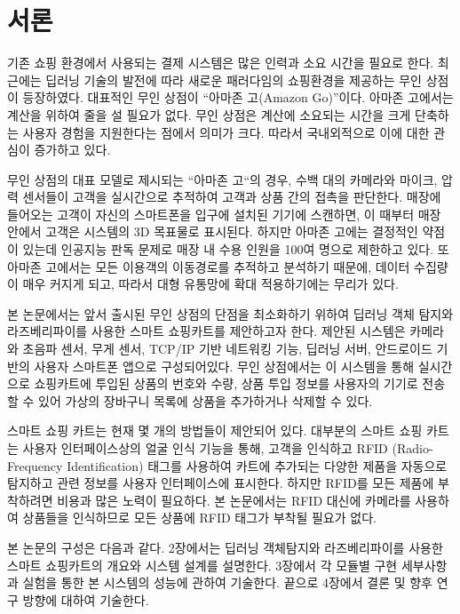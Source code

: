\documentclass[smallextended]{svjour3}       %
\begin{document}
\def\spacingset#1{\renewcommand{\baselinestretch}%
{#1}\small\normalsize} \spacingset{1}


\hypertarget{uxc11cuxb860}{%
\section{서론}\label{uxc11cuxb860}}

기존 쇼핑 환경에서 사용되는 결제 시스템은 많은 인력과 소요 시간을 필요로
한다. 최근에는 딥러닝 기술의 발전에 따라 새로운 패러다임의 쇼핑환경을
제공하는 무인 상점이 등장하였다. 대표적인 무인 상점이 ``아마존 고(Amazon
Go)''이다. 아마존 고에서는 계산을 위하여 줄을 설 필요가 없다. 무인
상점은 계산에 소요되는 시간을 크게 단축하는 사용자 경험을 지원한다는
점에서 의미가 크다. 따라서 국내외적으로 이에 대한 관심이 증가하고
있다\cite{wankhede2018just}.

무인 상점의 대표 모델로 제시되는 ``아마존 고``의 경우, 수백 대의
카메라와 마이크, 압력 센서들이 고객을 실시간으로 추적하여 고객과 상품
간의 접촉을 판단한다. 매장에 들어오는 고객이 자신의 스마트폰을 입구에
설치된 기기에 스캔하면, 이 때부터 매장 안에서 고객은 시스템의 3D
목표물로 표시된다. 하지만 아마존 고에는 결정적인 약점이 있는데 인공지능
판독 문제로 매장 내 수용 인원을 100여 명으로 제한하고 있다. 또 아마존
고에서는 모든 이용객의 이동경로를 추적하고 분석하기 때문에, 데이터
수집량이 매우 커지게 되고, 따라서 대형 유통망에 확대 적용하기에는 무리가
있다.

본 논문에서는 앞서 출시된 무인 상점의 단점을 최소화하기 위하여 딥러닝
객체 탐지와 라즈베리파이를 사용한 스마트 쇼핑카트를 제안하고자 한다.
제안된 시스템은 카메라와 초음파 센서, 무게 센서, TCP/IP 기반 네트워킹
기능, 딥러닝 서버, 안드로이드 기반의 사용자 스마트폰 앱으로
구성되어있다. 무인 상점에서는 이 시스템을 통해 실시간으로 쇼핑카트에
투입된 상품의 번호와 수량, 상품 투입 정보를 사용자의 기기로 전송할 수
있어 가상의 장바구니 목록에 상품을 추가하거나 삭제할 수 있다.

스마트 쇼핑 카트는 현재 몇 개의 방법들이 제안되어 있다. 대부분의 스마트
쇼핑 카트는 사용자 인터페이스상의 얼굴 인식 기능을 통해, 고객을 인식하고
RFID (Radio-Frequency Identification) 태그를 사용하여 카트에 추가되는
다양한 제품을 자동으로 탐지하고 관련 정보를 사용자 인터페이스에
표시한다. 하지만 RFID를 모든 제품에 부착하려면 비용과 많은 노력이
필요하다. 본 논문에서는 RFID 대신에 카메라를 사용하여 상품들을
인식하므로 모든 상품에 RFID 태그가 부착될 필요가
없다\cite{chiang2016development, karjol2017iot}.

본 논문의 구성은 다음과 같다. 2장에서는 딥러닝 객체탐지와 라즈베리파이를
사용한 스마트 쇼핑카트의 개요와 시스템 설계를 설명한다. 3장에서 각
모듈별 구현 세부사항과 실험을 통한 본 시스템의 성능에 관하여 기술한다.
끝으로 4장에서 결론 및 향후 연구 방향에 대하여 기술한다.
\end{document}
